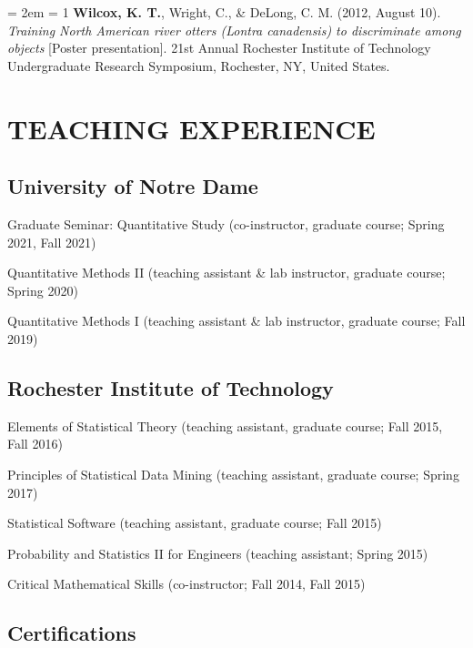 \documentclass[
  12 pt,
]{article}
\begin{document}
\hangindent = 2em \hangafter = 1 \textbf{Wilcox, K. T.}, Wright, C., \&
DeLong, C. M. (2012, August 10). \emph{Training North American river
otters (Lontra canadensis) to discriminate among objects} {[}Poster
presentation{]}. 21st Annual Rochester Institute of Technology
Undergraduate Research Symposium, Rochester, NY, United States.

\hypertarget{teaching-experience}{%
\section{TEACHING EXPERIENCE}\label{teaching-experience}}

\hypertarget{university-of-notre-dame}{%
\subsection{University of Notre Dame}\label{university-of-notre-dame}}

Graduate Seminar: Quantitative Study (co-instructor, graduate course;
Spring 2021, Fall 2021)

Quantitative Methods II (teaching assistant \& lab instructor, graduate
course; Spring 2020)

Quantitative Methods I (teaching assistant \& lab instructor, graduate
course; Fall 2019)

\hypertarget{rochester-institute-of-technology}{%
\subsection{Rochester Institute of
Technology}\label{rochester-institute-of-technology}}

Elements of Statistical Theory (teaching assistant, graduate course;
Fall 2015, Fall 2016)

Principles of Statistical Data Mining (teaching assistant, graduate
course; Spring 2017)

Statistical Software (teaching assistant, graduate course; Fall 2015)

Probability and Statistics II for Engineers (teaching assistant; Spring
2015)

Critical Mathematical Skills (co-instructor; Fall 2014, Fall 2015)

\hypertarget{certifications}{%
\subsection{Certifications}\label{certifications}}
\end{document}
